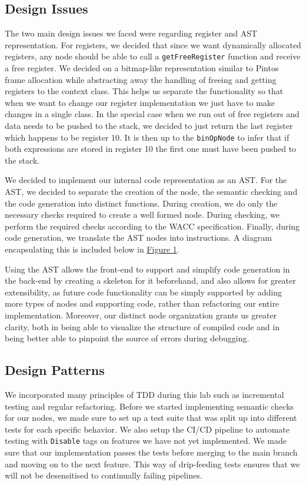 \documentclass[11pt,a4paper]{article}
\newcommand{\cmd}[1]{\texttt{#1}}
\begin{document}
\subsection{Design Issues}
The two main design issues we faced were regarding register and AST representation. For registers, we decided that since we want dynamically allocated registers, any node should be able to call a \cmd{getFreeRegister} function and receive a free register. We decided on a bitmap-like representation similar to Pintos frame allocation while abstracting away the handling of freeing and getting registers to the context class. This helps us separate the functionality so that when we want to change our register implementation we just have to make changes in a single class.  In the special case when we run out of free registers and data needs to be pushed to the stack, we decided to just return the last register which happens to be register 10. It is then up to the \cmd{binOpNode} to infer that if both expressions are stored in register 10 the first one must have been pushed to the stack. 

We decided to implement our internal code representation as an AST. For the AST, we decided to separate the creation of the node, the semantic checking and the code generation into distinct functions. During creation, we do only the necessary checks required to create a well formed node. During checking, we perform the required checks according to the WACC specification. Finally, during code generation, we translate the AST nodes into instructions. A diagram encapsulating this is included below in \hyperref[sec:figure1]{Figure 1}. 

Using the AST allows the front-end to support and simplify code generation in the back-end by creating a skeleton for it beforehand, and also allows for greater extensibility, as future code functionality can be simply supported by adding more types of nodes and supporting code, rather than refactoring our entire implementation. Moreover, our distinct node organization grants us greater clarity, both in being able to visualize the structure of compiled code and in being better able to pinpoint the source of errors during debugging.

\subsection{Design Patterns}
We incorporated many principles of TDD during this lab such as incremental testing and regular refactoring. Before we started implementing semantic checks for our nodes, we made sure to set up a test suite that was split up into different tests for each specific behavior. We also setup the CI/CD pipeline to automate testing with \cmd{Disable} tags on features we have not yet implemented. We made sure that our implementation passes the tests before merging to the main branch and moving on to the next feature. This way of drip-feeding tests ensures that we will not be desensitised to continually failing pipelines.
\end{document}
